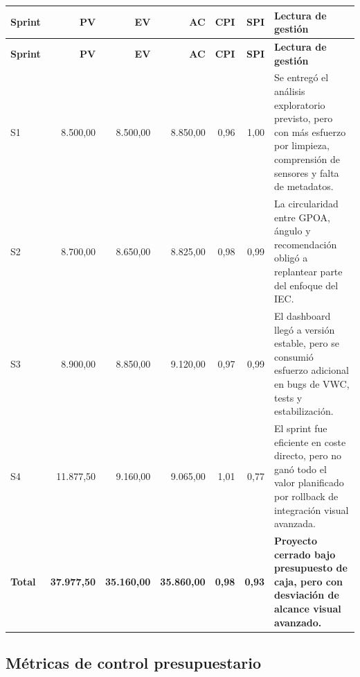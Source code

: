 \documentclass[11pt,a4paper]{article}
\begin{document}
\begin{longtable}{p{1.4cm}r r r r r p{5.4cm}}
\toprule
\textbf{Sprint} & \textbf{PV} & \textbf{EV} & \textbf{AC} & \textbf{CPI} & \textbf{SPI} & \textbf{Lectura de gestión} \\
\midrule
\endfirsthead
\toprule
\textbf{Sprint} & \textbf{PV} & \textbf{EV} & \textbf{AC} & \textbf{CPI} & \textbf{SPI} & \textbf{Lectura de gestión} \\
\midrule
\endhead
S1 & 8.500,00 & 8.500,00 & 8.850,00 & 0,96 & 1,00 & Se entregó el análisis exploratorio previsto, pero con más esfuerzo por limpieza, comprensión de sensores y falta de metadatos. \\
S2 & 8.700,00 & 8.650,00 & 8.825,00 & 0,98 & 0,99 & La circularidad entre GPOA, ángulo y recomendación obligó a replantear parte del enfoque del IEC. \\
S3 & 8.900,00 & 8.850,00 & 9.120,00 & 0,97 & 0,99 & El dashboard llegó a versión estable, pero se consumió esfuerzo adicional en bugs de VWC, tests y estabilización. \\
S4 & 11.877,50 & 9.160,00 & 9.065,00 & 1,01 & 0,77 & El sprint fue eficiente en coste directo, pero no ganó todo el valor planificado por rollback de integración visual avanzada. \\
\midrule
\textbf{Total} & \textbf{37.977,50} & \textbf{35.160,00} & \textbf{35.860,00} & \textbf{0,98} & \textbf{0,93} & \textbf{Proyecto cerrado bajo presupuesto de caja, pero con desviación de alcance visual avanzado.} \\
\bottomrule
\end{longtable}

\subsection{Métricas de control presupuestario}
\end{document}
